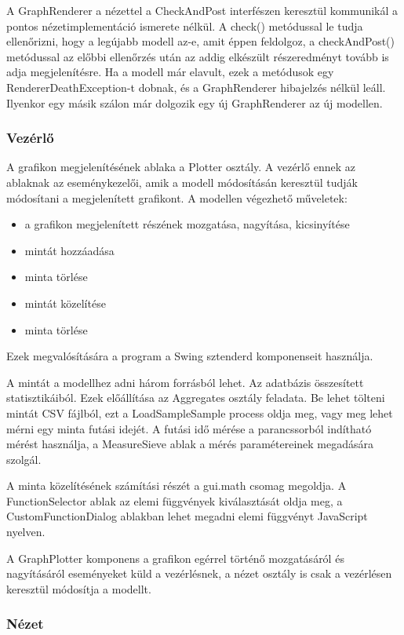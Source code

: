 A GraphRenderer a nézettel a CheckAndPost interfészen keresztül kommunikál a pontos nézetimplementáció ismerete nélkül. A check() metódussal le tudja ellenőrizni, hogy a legújabb modell az-e, amit éppen feldolgoz, a checkAndPost() metódussal az előbbi ellenőrzés után az addig elkészült részeredményt tovább is adja megjelenítésre.
Ha a modell már elavult, ezek a metódusok egy RendererDeathException-t dobnak, és a GraphRenderer hibajelzés nélkül leáll. Ilyenkor egy másik szálon már dolgozik egy új GraphRenderer az új modellen.

\subsubsection{Vezérlő}

A grafikon megjelenítésének ablaka a Plotter osztály.
A vezérlő ennek az ablaknak az eseménykezelői, amik a modell módosításán keresztül tudják módosítani a megjelenített grafikont.
A modellen végezhető műveletek:
\begin{itemize}
\item a grafikon megjelenített részének mozgatása, nagyítása, kicsinyítése
\item mintát hozzáadása
\item minta törlése
\item mintát közelítése
\item minta törlése
\end{itemize}
Ezek megvalósítására a program a Swing sztenderd komponenseit használja.

A mintát a modellhez adni három forrásból lehet.
Az adatbázis összesített statisztikáiból.
Ezek előállítása az Aggregates osztály feladata.
Be lehet tölteni mintát CSV fájlból, ezt a LoadSampleSample process oldja meg, vagy meg lehet mérni egy minta futási idejét. A futási idő mérése a parancssorból indítható mérést használja, a MeasureSieve ablak a mérés paramétereinek megadására szolgál.

A minta közelítésének számítási részét a gui.math csomag megoldja. A FunctionSelector ablak az elemi függvények kiválasztását oldja meg, a CustomFunctionDialog ablakban lehet megadni elemi függvényt JavaScript nyelven.

A GraphPlotter komponens a grafikon egérrel történő mozgatásáról és nagyításáról eseményeket küld a vezérlésnek, a nézet osztály is csak a vezérlésen keresztül módosítja a modellt.

\subsubsection{Nézet}

